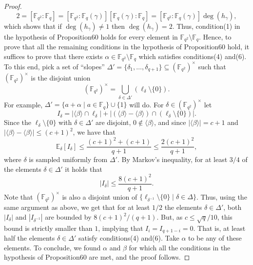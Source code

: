 \begin{proof}
\[2=[\mathbb F_{q^2}:\mathbb F_q]=[\mathbb F_{q^2}:\mathbb F_q(\gamma)][\mathbb F_q(\gamma):\mathbb F_q]=[\mathbb F_{q^2}:\mathbb F_q(\gamma)]\deg(h_\gamma),\]
which shows that if $\deg(h_\gamma)\ne1$ then $\deg(h_\gamma)=2$.
Thus, condition(1) in the hypothesis of Proposition60 holds for every element in $\mathbb F_{q^2}\setminus\mathbb F_q$. Hence, to prove that all the remaining conditions in the hypothesis of Proposition60 hold, it suffices to prove that there exists $\alpha\in\mathbb F_{q^2}\setminus\mathbb F_q$ which satisfies conditions(4) and(6). To this end, pick a set of ``slopes'' $\Delta'=\{\delta_1,\ldots,\delta_{q+1}\}\subseteq(\mathbb F_{q^2})^\times$ such that $(\mathbb F_{q^2})^\times$ is the disjoint union
\[(\mathbb F_{q^2})^\times=\bigcup_{\delta\in\Delta'}(\ell_\delta\setminus\{0\}).\]
For example, $\Delta'=\{a+\alpha\mid a\in\mathbb F_q\}\cup\{1\}$ will do. For $\delta\in(\mathbb F_{q^2})^\times$ let
\[I_\delta=|\langle\beta\rangle\cap\ell_\delta|+|(\langle\beta\rangle-\langle\beta\rangle)\cap(\ell_\delta\setminus\{0\})|.\]
Since the $\ell_\delta\setminus\{0\}$ with $\delta\in\Delta'$ are disjoint, $0\notin\langle\beta\rangle$, and since $|\langle\beta\rangle|=c+1$ and $|\langle\beta\rangle-\langle\beta\rangle|\leq(c+1)^2$, we have that
\[\mathbb E_\delta[I_\delta]\leq\frac{(c+1)^2+(c+1)}{q+1}\leq\frac{2(c+1)^2}{q+1},\]
where $\delta$ is sampled uniformly from $\Delta'$. By Markov's inequality, for at least $3/4$ of the elements $\delta\in\Delta'$ it holds that
\[|I_\delta|\leq\frac{8(c+1)^2}{q+1}.\]
Note that $(\mathbb F_{q^2})^\times$ is also a disjoint union of $\{\ell_{\delta^{-1}}\setminus\{0\}\mid\delta\in\Delta\}$. Thus, using the same argument as above, we get that for at least $1/2$ the elements $\delta\in\Delta'$, both $|I_\delta|$ and $|I_{\delta^{-1}}|$ are bounded by $8(c+1)^2/(q+1)$. But, as $c\leq\sqrt q/10$, this bound is strictly smaller than $1$, implying that $I_i=I_{q+1-i}=0$. That is, at least half the elements $\delta\in\Delta'$ satisfy conditions(4) and(6). Take $\alpha$ to be any of these elements. To conclude, we found $\alpha$ and $\beta$ for which all the conditions in the hypothesis of Proposition60 are met, and the proof follows.
\end{proof}
